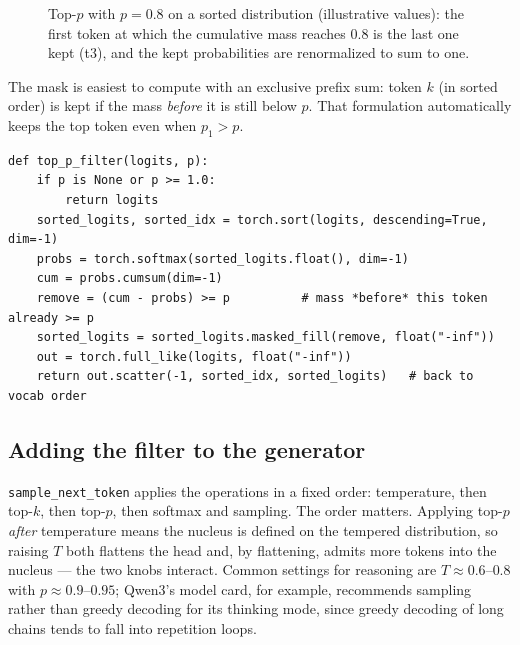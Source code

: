 \begin{figure}[t]
\centering
{}
\caption{Top-$p$ with $p = 0.8$ on a sorted distribution (illustrative values): the first token at
which the cumulative mass reaches $0.8$ is the last one kept (t3), and the kept probabilities are
renormalized to sum to one.}
\label{fig:scaling:topp}
\end{figure}

The mask is easiest to compute with an exclusive prefix sum: token $k$ (in sorted order) is kept
if the mass \emph{before} it is still below $p$. That formulation automatically keeps the top token
even when $p_1 > p$.

\begin{lstlisting}[caption={Top-$p$ filter on logits (\texttt{llmsys/generate.py}).},label={lst:scaling:topp}]
def top_p_filter(logits, p):
    if p is None or p >= 1.0:
        return logits
    sorted_logits, sorted_idx = torch.sort(logits, descending=True, dim=-1)
    probs = torch.softmax(sorted_logits.float(), dim=-1)
    cum = probs.cumsum(dim=-1)
    remove = (cum - probs) >= p          # mass *before* this token already >= p
    sorted_logits = sorted_logits.masked_fill(remove, float("-inf"))
    out = torch.full_like(logits, float("-inf"))
    return out.scatter(-1, sorted_idx, sorted_logits)   # back to vocab order
\end{lstlisting}

\subsection{Adding the filter to the generator}\label{sec:scaling:addtopp}
\texttt{sample\_next\_token} applies the operations in a fixed order: temperature, then top-$k$,
then top-$p$, then softmax and sampling. The order matters. Applying top-$p$ \emph{after}
temperature means the nucleus is defined on the tempered distribution, so raising $T$ both flattens
the head and, by flattening, admits more tokens into the nucleus --- the two knobs interact. Common
settings for reasoning are $T \approx 0.6$--$0.8$ with $p \approx 0.9$--$0.95$; Qwen3's model card,
for example, recommends sampling rather than greedy decoding for its thinking mode, since greedy
decoding of long chains tends to fall into repetition loops.

